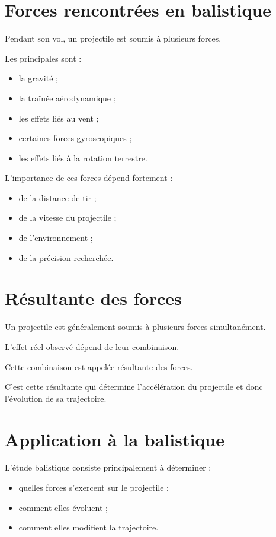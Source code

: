 \section{Forces rencontrées en balistique}

Pendant son vol, un projectile est soumis à plusieurs forces.

Les principales sont :

\begin{itemize}
\item la gravité ;
\item la traînée aérodynamique ;
\item les effets liés au vent ;
\item certaines forces gyroscopiques ;
\item les effets liés à la rotation terrestre.
\end{itemize}

L'importance de ces forces dépend fortement :

\begin{itemize}
\item de la distance de tir ;
\item de la vitesse du projectile ;
\item de l'environnement ;
\item de la précision recherchée.
\end{itemize}

\section{Résultante des forces}

Un projectile est généralement soumis à plusieurs forces simultanément.

L'effet réel observé dépend de leur combinaison.

Cette combinaison est appelée résultante des forces.

C'est cette résultante qui détermine l'accélération du projectile et donc
l'évolution de sa trajectoire.

\section{Application à la balistique}

L'étude balistique consiste principalement à déterminer :

\begin{itemize}
\item quelles forces s'exercent sur le projectile ;
\item comment elles évoluent ;
\item comment elles modifient la trajectoire.
\end{itemize}


